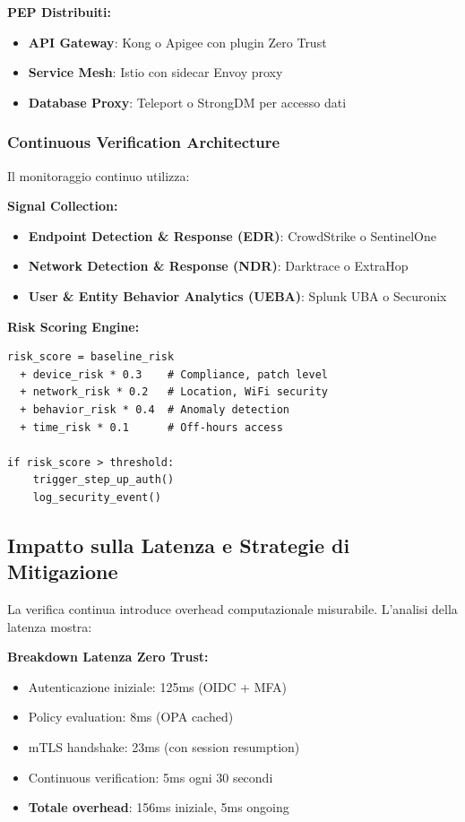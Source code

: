 \textbf{PEP Distribuiti:}
\begin{itemize}
    \item \textbf{API Gateway}: Kong o Apigee con plugin Zero Trust
    \item \textbf{Service Mesh}: Istio con sidecar Envoy proxy
    \item \textbf{Database Proxy}: Teleport o StrongDM per accesso dati
\end{itemize}

\subsubsection{\texorpdfstring{\textbf{Continuous Verification Architecture}}{3.5.3.2 - Continuous Verification Architecture}}

Il monitoraggio continuo utilizza:

\textbf{Signal Collection:}
\begin{itemize}
    \item \textbf{Endpoint Detection \& Response (EDR)}: CrowdStrike o SentinelOne
    \item \textbf{Network Detection \& Response (NDR)}: Darktrace o ExtraHop
    \item \textbf{User \& Entity Behavior Analytics (UEBA)}: Splunk UBA o Securonix
\end{itemize}

\textbf{Risk Scoring Engine:}
\begin{lstlisting}[caption={Calcolo Risk Score real-time},label={lst:risk_score}]
risk_score = baseline_risk
  + device_risk * 0.3    # Compliance, patch level
  + network_risk * 0.2   # Location, WiFi security  
  + behavior_risk * 0.4  # Anomaly detection
  + time_risk * 0.1      # Off-hours access

if risk_score > threshold:
    trigger_step_up_auth()
    log_security_event()
\end{lstlisting}

\subsection{\texorpdfstring{\textbf{Impatto sulla Latenza e Strategie di Mitigazione}}{3.5.4 - Impatto sulla Latenza e Strategie di Mitigazione}}

La verifica continua introduce overhead computazionale misurabile. L'analisi della latenza mostra:

\textbf{Breakdown Latenza Zero Trust:}
\begin{itemize}
    \item Autenticazione iniziale: 125ms (OIDC + MFA)
    \item Policy evaluation: 8ms (OPA cached)
    \item mTLS handshake: 23ms (con session resumption)
    \item Continuous verification: 5ms ogni 30 secondi
    \item \textbf{Totale overhead}: 156ms iniziale, 5ms ongoing
\end{itemize}

